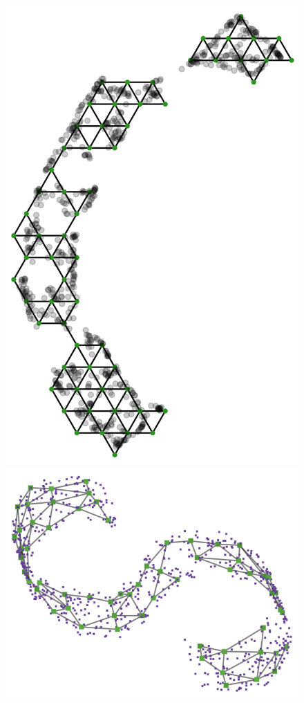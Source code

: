 \documentclass[
  12pt]{article}
\begin{document}
\begin{figure}[H]

\begin{minipage}{0.25\linewidth}
\includegraphics{figures/scurve/sc_best_trimesh.png}\end{minipage}%
%
\begin{minipage}{0.25\linewidth}
\includegraphics{figures/scurve/sc_1.png}\end{minipage}%

\end{figure}
\end{document}
